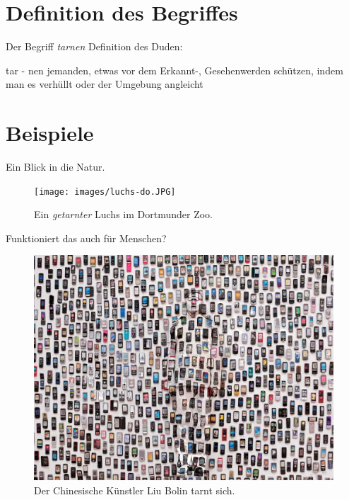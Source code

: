 \section{Definition des Begriffes}

\begin{frame}{Der Begriff \textit{tarnen}}
  Definition des Duden:
  \begin{block}{{\centering tar - nen}}
    jemanden, etwas vor dem Erkannt-, Gesehenwerden sch\"utzen,
    indem man es verh\"ullt oder der Umgebung angleicht
  \end{block}
\end{frame}

\section{Beispiele}
\begin{frame}{Ein Blick in die Natur.}
  \begin{figure}
    \centering
    \caption{Ein \textit{getarnter} Luchs im Dortmunder Zoo.}
    \texttt{[image: images/luchs-do.JPG]}
  \end{figure}
\end{frame}

\begin{frame}{Funktioniert das auch f\"ur Menschen?}
  \begin{figure}
    \centering
    \caption{Der Chinesische K\"unstler Liu Bolin tarnt sich. \cite{humanhide}}
    \includegraphics[height=0.8\textheight]{images/liubolin.jpg}
  \end{figure}
\end{frame}

